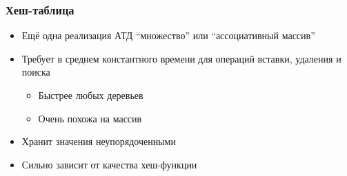 \documentclass{../../slides-style}
\begin{document}
    
    \begin{frame}[plain]
        \titlepage
    \end{frame}

    \begin{frame}
        \frametitle{Хеш-таблица}
        \begin{itemize}
            \item Ещё одна реализация АТД ``множество'' или ``ассоциативный массив''
            \item Требует в среднем константного времени для операций вставки, удаления и поиска
            \begin{itemize}
                \item Быстрее любых деревьев
                \item Очень похожа на массив
            \end{itemize}
            \item Хранит значения неупорядоченными
            \item Сильно зависит от качества хеш-функции
        \end{itemize}
    \end{frame}
\end{document}
